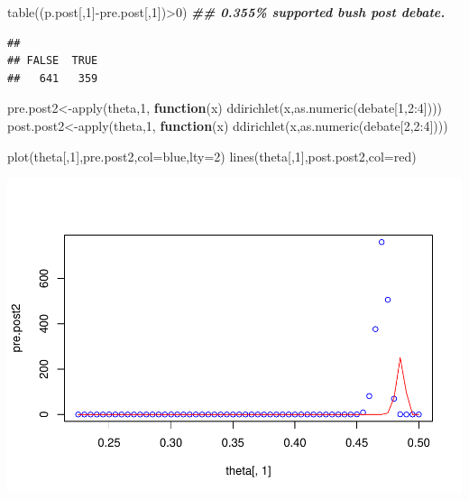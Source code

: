 \documentclass[
]{book}
\newenvironment{Shaded}{\begin{snugshade}}{\end{snugshade}}
\newcommand{\AttributeTok}[1]{\textcolor[rgb]{0.77,0.63,0.00}{#1}}
\newcommand{\ControlFlowTok}[1]{\textcolor[rgb]{0.13,0.29,0.53}{\textbf{#1}}}
\newcommand{\DecValTok}[1]{\textcolor[rgb]{0.00,0.00,0.81}{#1}}
\newcommand{\DocumentationTok}[1]{\textcolor[rgb]{0.56,0.35,0.01}{\textbf{\textit{#1}}}}
\newcommand{\FunctionTok}[1]{\textcolor[rgb]{0.00,0.00,0.00}{#1}}
\newcommand{\NormalTok}[1]{#1}
\newcommand{\OtherTok}[1]{\textcolor[rgb]{0.56,0.35,0.01}{#1}}
\newcommand{\SpecialCharTok}[1]{\textcolor[rgb]{0.00,0.00,0.00}{#1}}
\newcommand{\StringTok}[1]{\textcolor[rgb]{0.31,0.60,0.02}{#1}}
\theoremstyle{definition}
\theoremstyle{definition}
\theoremstyle{definition}
\theoremstyle{definition}
\theoremstyle{remark}
\begin{document}
\begin{Shaded}
\begin{Highlighting}[]
   \FunctionTok{table}\NormalTok{((p.post[,}\DecValTok{1}\NormalTok{]}\SpecialCharTok{{-}}\NormalTok{pre.post[,}\DecValTok{1}\NormalTok{])}\SpecialCharTok{\textgreater{}}\DecValTok{0}\NormalTok{) }\DocumentationTok{\#\# 0.355\% supported bush post debate.}
\end{Highlighting}
\end{Shaded}

\begin{verbatim}
## 
## FALSE  TRUE 
##   641   359
\end{verbatim}

\begin{Shaded}
\begin{Highlighting}[]
\NormalTok{ pre.post2}\OtherTok{\textless{}{-}}\FunctionTok{apply}\NormalTok{(theta,}\DecValTok{1}\NormalTok{, }\ControlFlowTok{function}\NormalTok{(x) }\FunctionTok{ddirichlet}\NormalTok{(x,}\FunctionTok{as.numeric}\NormalTok{(debate[}\DecValTok{1}\NormalTok{,}\DecValTok{2}\SpecialCharTok{:}\DecValTok{4}\NormalTok{])))}
\NormalTok{ post.post2}\OtherTok{\textless{}{-}}\FunctionTok{apply}\NormalTok{(theta,}\DecValTok{1}\NormalTok{, }\ControlFlowTok{function}\NormalTok{(x) }\FunctionTok{ddirichlet}\NormalTok{(x,}\FunctionTok{as.numeric}\NormalTok{(debate[}\DecValTok{2}\NormalTok{,}\DecValTok{2}\SpecialCharTok{:}\DecValTok{4}\NormalTok{])))}
 
  \FunctionTok{plot}\NormalTok{(theta[,}\DecValTok{1}\NormalTok{],pre.post2,}\AttributeTok{col=}\StringTok{\textquotesingle{}blue\textquotesingle{}}\NormalTok{,}\AttributeTok{lty=}\DecValTok{2}\NormalTok{)}
  \FunctionTok{lines}\NormalTok{(theta[,}\DecValTok{1}\NormalTok{],post.post2,}\AttributeTok{col=}\StringTok{\textquotesingle{}red\textquotesingle{}}\NormalTok{)}
\end{Highlighting}
\end{Shaded}

\includegraphics{_main_files/figure-latex/unnamed-chunk-30-2.pdf}
\end{document}
